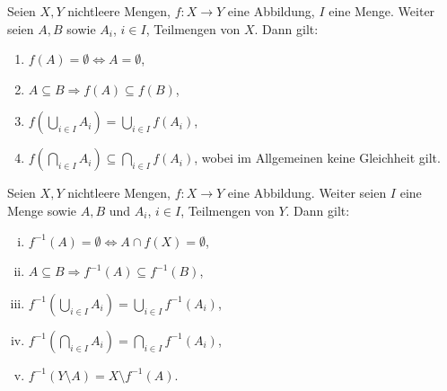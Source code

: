 \begin{theorem}
Seien $X,Y$ nichtleere Mengen, $f:X \to Y$ eine Abbildung, $I$ eine Menge.
Weiter seien $A,B$ sowie $A_i$, $i \in I$, Teilmengen von $X$.
Dann gilt:
\begin{enumerate}
        \item
        $f(A) = \emptyset \iff A = \emptyset$,
        \item
        $A \subseteq B \Rightarrow f(A) \subseteq f(B)$,
        \item
        $ f(\bigcup_{i \in I}A_i) = \bigcup_{i \in I}f(A_i)$,
        \item
        $ f(\bigcap_{i \in I}A_i) \subseteq \bigcap_{i \in I}f(A_i)$, wobei im Allgemeinen keine Gleichheit gilt.
\end{enumerate}
\end{theorem}

\begin{proof*}
\end{proof*}

\begin{theorem}
Seien $X,Y$ nichtleere Mengen, $f:X \to Y$ eine Abbildung.
Weiter seien $I$ eine Menge sowie $A,B$ und $A_i$, $i \in I$, Teilmengen von $Y$.
Dann gilt:
    \begin{enumerate}[(i)]
        \item
        $f^{-1}(A) = \emptyset \iff A \cap f(X) = \emptyset$,
        \item
        $A \subseteq B \Rightarrow f^{-1}(A) \subseteq f^{-1}(B)$,
        \item
        $f^{-1}(\bigcup_{i \in I}A_i) = \bigcup_{i \in I}f^{-1}(A_i)$,
        \item
        $f^{-1}(\bigcap_{i \in I}A_i) = \bigcap_{i \in I}f^{-1}(A_i)$,
        \item
        $f^{-1}(Y \setminus A) = X \setminus f^{-1}(A)$.
    \end{enumerate}
\end{theorem}

\begin{proof*}
\end{proof*}
